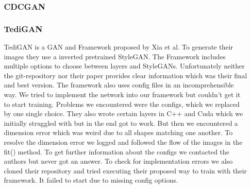 \documentclass[12pt, a4paper]{article}
\begin{document}
\subsubsection{CDCGAN}
\subsubsection{TediGAN}
TediGAN is a GAN and Framework proposed by Xia et al. To generate their images they use a inverted pretrained StyleGAN. The Framework includes multiple options to choose between layers and StyleGANs. Unfortunately neither the git-repository nor their paper provides clear information which was their final and best version. The framework also uses config files in an incomprehensible way. We tried to implement the network into our framework but couldn't get it to start training. Problems we encountered were the configs, which we replaced by one single choice. They also wrote certain layers in C++ and Cuda which we initially struggled with but in the end got to work. But then we encountered a dimension error which was weird due to all shapes matching one another. To resolve the dimension error we logged and followed the flow of the images in the fit() method. To get further information about the configs we contacted the authors but never got an answer.
To check for implementation errors we also cloned their repository and tried executing their proposed way to train with their framework. It failed to start due to missing config options.
\end{document}
